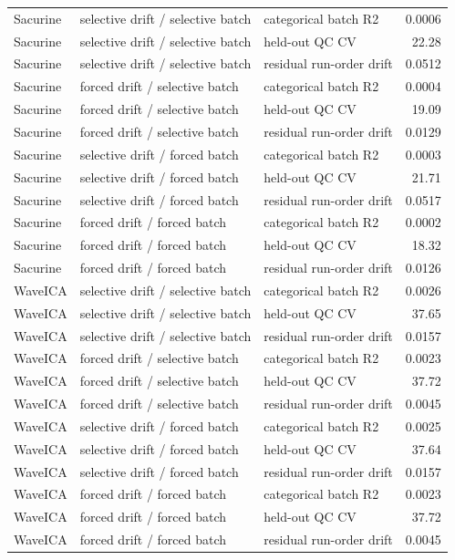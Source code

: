 \begin{longtable}{lllr}
Sacurine & selective drift / selective batch & categorical batch R2 & 0.0006 \\
Sacurine & selective drift / selective batch & held-out QC CV & 22.28 \\
Sacurine & selective drift / selective batch & residual run-order drift & 0.0512 \\
Sacurine & forced drift / selective batch & categorical batch R2 & 0.0004 \\
Sacurine & forced drift / selective batch & held-out QC CV & 19.09 \\
Sacurine & forced drift / selective batch & residual run-order drift & 0.0129 \\
Sacurine & selective drift / forced batch & categorical batch R2 & 0.0003 \\
Sacurine & selective drift / forced batch & held-out QC CV & 21.71 \\
Sacurine & selective drift / forced batch & residual run-order drift & 0.0517 \\
Sacurine & forced drift / forced batch & categorical batch R2 & 0.0002 \\
Sacurine & forced drift / forced batch & held-out QC CV & 18.32 \\
Sacurine & forced drift / forced batch & residual run-order drift & 0.0126 \\
WaveICA & selective drift / selective batch & categorical batch R2 & 0.0026 \\
WaveICA & selective drift / selective batch & held-out QC CV & 37.65 \\
WaveICA & selective drift / selective batch & residual run-order drift & 0.0157 \\
WaveICA & forced drift / selective batch & categorical batch R2 & 0.0023 \\
WaveICA & forced drift / selective batch & held-out QC CV & 37.72 \\
WaveICA & forced drift / selective batch & residual run-order drift & 0.0045 \\
WaveICA & selective drift / forced batch & categorical batch R2 & 0.0025 \\
WaveICA & selective drift / forced batch & held-out QC CV & 37.64 \\
WaveICA & selective drift / forced batch & residual run-order drift & 0.0157 \\
WaveICA & forced drift / forced batch & categorical batch R2 & 0.0023 \\
WaveICA & forced drift / forced batch & held-out QC CV & 37.72 \\
WaveICA & forced drift / forced batch & residual run-order drift & 0.0045 \\
\end{longtable}
